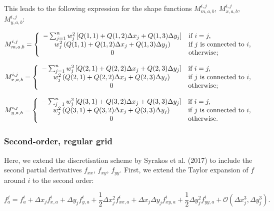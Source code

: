 \documentclass{article}
\begin{document}
This leads to the following expression for the shape functions $M_{m,a,b}^{i,j}$, $M_{x,a,b}^{i,j}$, $M_{y,a,b}^{i,j}$:

\begin{equation}
M_{m,a,b}^{i,j} = \left\{
\begin{array}{ c l }
-\sum_{j=1}^n w_j^2 \left[ Q(1,1) + Q(1,2) \Delta x_j + Q(1,3) \Delta y_j \right] & \textrm{if } i = j, \\
w_j^2 \left( Q(1,1) + Q(1,2) \Delta x_j + Q(1,3) \Delta y_j \right) & \textrm{if } j \textrm{ is connected to } i, \\
0 & \textrm{otherwise};
\end{array}
\right.
\end{equation}

\begin{equation}
M_{x,a,b}^{i,j} = \left\{
\begin{array}{ c l }
-\sum_{j=1}^n w_j^2 \left[ Q(2,1) + Q(2,2) \Delta x_j + Q(2,3) \Delta y_j \right] & \textrm{if } i = j, \\
w_j^2 \left( Q(2,1) + Q(2,2) \Delta x_j + Q(2,3) \Delta y_j \right) & \textrm{if } j \textrm{ is connected to } i, \\
0 & \textrm{otherwise};
\end{array}
\right.
\end{equation}

\begin{equation}
M_{y,a,b}^{i,j} = \left\{
\begin{array}{ c l }
-\sum_{j=1}^n w_j^2 \left[ Q(3,1) + Q(3,2) \Delta x_j + Q(3,3) \Delta y_j \right] & \textrm{if } i = j, \\
w_j^2 \left( Q(3,1) + Q(3,2) \Delta x_j + Q(3,3) \Delta y_j \right) & \textrm{if } j \textrm{ is connected to } i, \\
0 & \textrm{otherwise}.
\end{array}
\right.
\end{equation}

\subsubsection{Second-order, regular grid}

Here, we extend the discretisation scheme by Syrakos et al. (2017) to include the second partial derivatives $f_{xx}$, $f_{xy}$, $f_{yy}$. First, we extend the Taylor expansion of $f$ around $i$ to the second order:

\begin{equation} \label{eq:disc_taylor2}
f_a^j = f_a^i + \Delta x_j f_{x,a}^i + \Delta y_j f_{y,a}^i
+ \frac12 \Delta x_j^2 f_{xx,a}^i + \Delta x_j \Delta y_j f_{xy,a}^i + \frac12 \Delta y_j^2 f_{yy,a}^i
+ \mathcal{O} \left( \Delta x_j^3, \Delta y_j^3 \right).
\end{equation}
\end{document}
